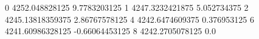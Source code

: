 0 4252.048828125 9.7783203125
1 4247.3232421875 5.052734375
2 4245.13818359375 2.86767578125
4 4242.6474609375 0.376953125
6 4241.60986328125 -0.66064453125
8 4242.2705078125 0.0

